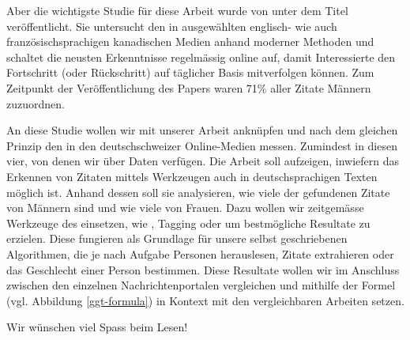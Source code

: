 Aber die wichtigste Studie für diese Arbeit wurde von \citeauthor{gender_gap_tracker} unter
dem Titel  \cite{gender_gap_tracker} veröffentlicht.
Sie untersucht den  in ausgewählten englisch- wie auch französischsprachigen
kanadischen Medien anhand moderner  Methoden und schaltet die neusten Erkenntnisse
regelmässig online \cite{gender_gap_tracker-website} auf, damit Interessierte den Fortschritt (oder Rückschritt) auf täglicher Basis
mitverfolgen können. Zum Zeitpunkt der Veröffentlichung des Papers waren 71\% aller Zitate
Männern zuzuordnen.

An diese Studie wollen wir mit unserer Arbeit anknüpfen und nach dem gleichen Prinzip
den  in den deutschschweizer Online-Medien messen. Zumindest in diesen vier,
von denen wir über Daten verfügen. Die Arbeit soll aufzeigen, inwiefern das Erkennen von Zitaten
mittels  Werkzeugen auch in deutschsprachigen Texten möglich ist. Anhand dessen
soll sie analysieren, wie viele der gefundenen Zitate von Männern sind und wie viele von Frauen.
Dazu wollen wir zeitgemässe Werkzeuge des  einsetzen, wie ,  Tagging
oder  um bestmögliche Resultate zu erzielen. Diese fungieren als Grundlage
für unsere selbst geschriebenen Algorithmen, die je nach Aufgabe Personen herauslesen, Zitate
extrahieren oder das Geschlecht einer Person bestimmen.
Diese Resultate wollen wir im Anschluss zwischen den einzelnen Nachrichtenportalen vergleichen und mithilfe der  
Formel (vgl. Abbildung \ref{ggt-formula}) in Kontext mit den vergleichbaren Arbeiten setzen.

Wir wünschen viel Spass beim Lesen!